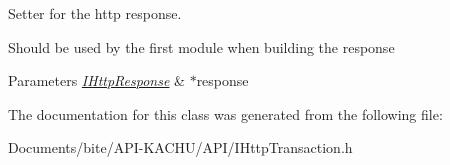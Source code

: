 Setter for the http response. 

Should be used by the first module when building the response 
\begin{DoxyParams}{Parameters}
{\em \hyperlink{class_a_p_i_kachu_1_1_i_http_response}{I\+Http\+Response}} & $\ast$response \\
\hline
\end{DoxyParams}


The documentation for this class was generated from the following file\+:\begin{DoxyCompactItemize}
\item 
Documents/bite/\+A\+P\+I-\/\+K\+A\+C\+H\+U/\+A\+P\+I/I\+Http\+Transaction.\+h\end{DoxyCompactItemize}
